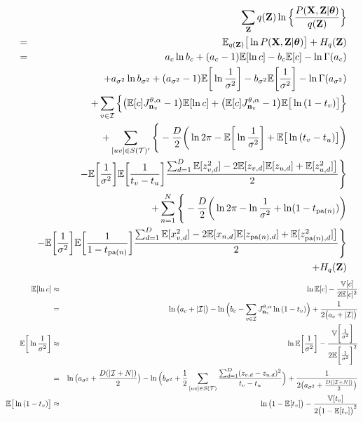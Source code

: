 \documentclass{article}
\begin{document}
	\begin{eqnarray}
		& & \sum_\bold{Z}q(\bold{Z})\ln \Big\{ \frac{P(\bold{X}, \bold{Z}| \boldsymbol{\theta})}{q(\bold{Z})} \Big\} \nonumber \\
		&=& \mathbb{E}_{q(\bold{Z})} \big[ \ln{P(\bold{X}, \bold{Z}|\boldsymbol{\theta})} \big]	+ H_{q}(\bold{Z})
		\nonumber \\
		&=& a_c\ln{b_c} + (a_c - 1)\mathbb{E}[\ln{c}] - b_c\mathbb{E}[c] -\ln{\Gamma(a_c)} \nonumber \\
		& & + a_{\sigma^2}\ln{b_{\sigma^2}} + (a_{\sigma^2} - 1)\mathbb{E}\bigg[ \ln{\frac{1}{\sigma^2}} \bigg] - b_{\sigma^2}\mathbb{E}\bigg[ \frac{1}{\sigma^2} \bigg] - \ln{\Gamma(a_{\sigma^2})} \nonumber \\
		& & + \sum_{v \in \mathcal{I}} \Big\{ \big( \mathbb{E}[c]J^{\theta, \alpha}_{\bold{n}_v} - 1 \big) \mathbb{E}[\ln{c}] + \big( \mathbb{E}[c]J^{\theta, \alpha}_{\bold{n}_v} - 1 \big)\mathbb{E} \big[ \ln{(1 - t_v)} \big] \Big\} \nonumber \\
		& & + \sum_{[uv] \in S(\mathcal{T})'} \Bigg\{-\frac{D}{2} \bigg(\ln{2\pi} - \mathbb{E}\bigg[ \ln{\frac{1}{\sigma^2}} \bigg] + \mathbb{E} \big[ \ln{(t_v - t_u) \big]} \bigg) \nonumber \\
		& & - \mathbb{E}\bigg[ \frac{1}{\sigma^2} \bigg] \mathbb{E}\bigg[ \frac{1}{t_v - t_u} \bigg] \frac{ \sum^D_{d=1} \mathbb{E} [z_{v,d}^2] - 2\mathbb{E}[z_{v,d}]\mathbb{E}[z_{u,d}] + \mathbb{E}[z_{u,d}^2] \big]}{2} \Bigg\} \nonumber \\
	 	& & + \sum^N_{n=1} \Bigg\{-\frac{D}{2} \bigg( \ln{2\pi} - \ln{\frac{1}{\sigma^2}} + \ln(1 - t_{\textrm{pa}(n)}) \bigg) \nonumber \\
	 	& & - \mathbb{E}\bigg[ \frac{1}{\sigma^2} \bigg] \mathbb{E}\bigg[ \frac{1}{1 - t_{\textrm{pa}(n)}} \bigg] \frac{\sum^D_{d=1} \mathbb{E}[x^2_{v,d}] - 2\mathbb{E}[x_{n, d}]\mathbb{E}[z_{\textrm{pa}(n), d}] + \mathbb{E}[z^2_{\textrm{pa}(n), d}] \big]}{2} \Bigg\} \nonumber \\
	 	& & + H_q(\bold{Z})
	\end{eqnarray}
	\begin{eqnarray}
		\mathbb{E}[\ln{c}] &\approx & \ln{\mathbb{E}[c]} - \frac{\mathbb{V}[c]}{2\mathbb{E}[c]^2} \nonumber \\
		&=& \ln{ \big( a_c + |\mathcal{I}| \big)} - \ln{ \Big( b_c - \sum_{v \in \mathcal{I}}J^{\theta, \alpha}_{\bold{n}_v}\ln{(1 - t_v})\Big)} + \frac{1}{2 \big( a_c + |\mathcal{I}| \big)} \\
		\mathbb{E} \bigg[ \ln{\frac{1}{\sigma^2}} \bigg] &\approx & \ln{\mathbb{E} \bigg[ \frac{1}{\sigma^2} \bigg]} - \frac{\mathbb{V}\bigg[ \frac{1}{\sigma^2} \bigg]}{2\mathbb{E}\bigg[ \frac{1}{\sigma^2} \bigg]^2} \nonumber \\
		&=& \ln{ \big( a_{\sigma^2} + \frac{D(|\mathcal{I} + N|)}{2} \big) } - \ln{ \Big( b_{\sigma^2} + \frac{1}{2}\sum_{[uv] \in S(\mathcal{T})}\frac{\sum^D_{d=1}(z_{v,d} - z_{u,d})^2}{t_v - t_u}\Big)} + \frac{1}{2 \big( a_{\sigma^2} + \frac{D(|\mathcal{I} + N|)}{2} \big)}	 \nonumber \\
		\mathbb{E} \big[ \ln{(1 - t_v)} \big] &\approx & \ln{ \big( 1 - \mathbb{E}[t_v] \big)} - \frac{\mathbb{V}[t_v]}{2 \big( 1 - \mathbb{E}[t_v] \big)^2}
	\end{eqnarray}

	
\end{document}
